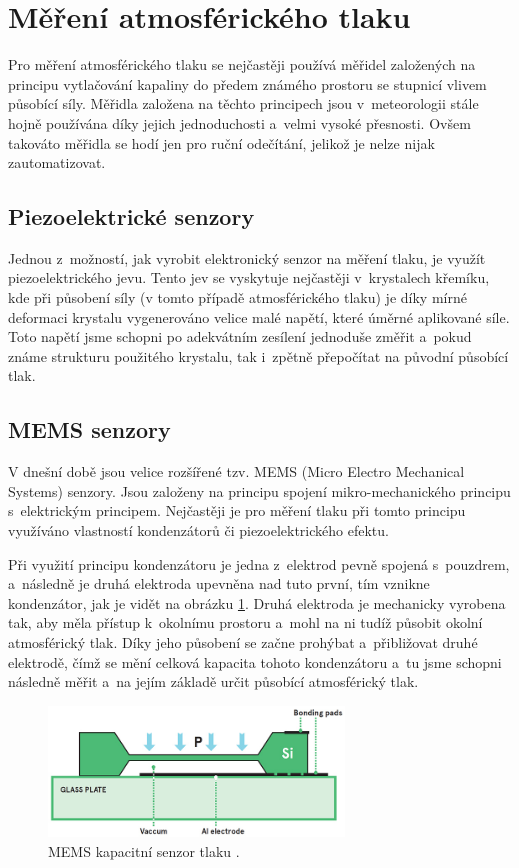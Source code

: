 \section{Měření atmosférického tlaku}

Pro měření atmosférického tlaku se nejčastěji používá měřidel založených na principu vytlačování kapaliny do předem známého prostoru se stupnicí vlivem působící síly. Měřidla založena na těchto principech jsou v~meteorologii stále hojně používána díky jejich jednoduchosti a~velmi vysoké přesnosti. Ovšem takováto měřidla se hodí jen pro ruční odečítání, jelikož je nelze nijak zautomatizovat.

\subsection{Piezoelektrické senzory}

Jednou z~možností, jak vyrobit elektronický senzor na měření tlaku, je využít piezoelektrického jevu. Tento jev se vyskytuje nejčastěji v~krystalech křemíku, kde při působení síly (v tomto případě atmosférického tlaku) je díky mírné deformaci krystalu vygenerováno velice malé napětí, které úměrné aplikované síle. Toto napětí jsme schopni po adekvátním zesílení jednoduše změřit a~pokud známe strukturu použitého krystalu, tak i~zpětně přepočítat na původní působící tlak.

\subsection{MEMS senzory}

V dnešní době jsou velice rozšířené tzv. MEMS (Micro Electro Mechanical Systems) senzory. Jsou založeny na principu spojení mikro-mechanického principu s~elektrickým principem. Nejčastěji je pro měření tlaku při tomto principu využíváno vlastností kondenzátorů či piezoelektrického efektu.

Při využití principu kondenzátoru je jedna z~elektrod pevně spojená s~pouzdrem, a~následně je druhá elektroda upevněna nad tuto první, tím vznikne kondenzátor, jak je vidět na obrázku \ref{fig_memsCapacitiveSensor}. Druhá elektroda je mechanicky vyrobena tak, aby měla přístup k~okolnímu prostoru a~mohl na ni tudíž působit okolní atmosférický tlak. Díky jeho působení se začne prohýbat a~přibližovat druhé elektrodě, čímž se mění celková kapacita tohoto kondenzátoru a~tu jsme schopni následně měřit a~na jejím základě určit působící atmosférický tlak.

\begin{figure}
    \centering
    \includegraphics[width=0.7\textwidth]{obrazky/MEMS_capacitive_sensor.jpg}
    \caption[MEMS kapacitní senzor tlaku.]{MEMS kapacitní senzor tlaku \cite{AvnetMEMS}.}
    \label{fig_memsCapacitiveSensor}
\end{figure}


